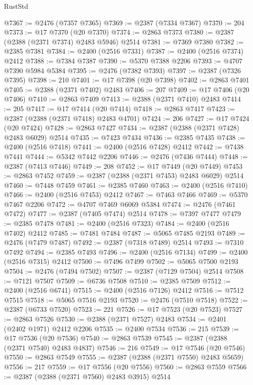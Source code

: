 \begin{lexlean}{RustStd}
\begin{coremodule}
@7367 := @2476 (@7357 @7365)
@7369 := @2387 (@7334 @7367)
@7370 := 204
@7373 := @17 @7370 (@20 @7370)
@7374 := @2863 @7373
@7380 := @2387 (@2388 (@2371 @7374) @2483 @5946) @2514
@7381 := @7369 @7380
@7382 := @2385 @7381
@7384 := @2400 (@2516 @7331)
@7387 := @2400 (@2516 @7374) @2412
@7388 := @7384 @7387
@7390 := @5370 @7388 @2206
@7393 := @4707 @7390 @5984 @5384
@7395 := @2476 (@7382 @7393)
@7397 := @2387 (@7326 @7395)
@7398 := 210
@7401 := @17 @7398 (@20 @7398)
@7402 := @2863 @7401
@7405 := @2388 (@2371 @7402) @2483
@7406 := 207
@7409 := @17 @7406 (@20 @7406)
@7410 := @2863 @7409
@7413 := @2388 (@2371 @7410) @2483
@7414 := 205
@7417 := @17 @7414 (@20 @7414)
@7418 := @2863 @7417
@7423 := @2387 (@2388 (@2371 @7418) @2483 @4701)
@7424 := 206
@7427 := @17 @7424 (@20 @7424)
@7428 := @2863 @7427
@7434 := @2387 (@2388 (@2371 @7428) @2483 @6029) @2514
@7435 := @7423 @7434
@7436 := @2385 @7435
@7438 := @2400 (@2516 @7418)
@7441 := @2400 (@2516 @7428) @2412
@7442 := @7438 @7441
@7444 := @5342 @7442 @2206
@7446 := @2476 (@7436 @7444)
@7448 := @2387 (@7413 @7446)
@7449 := 208
@7452 := @17 @7449 (@20 @7449)
@7453 := @2863 @7452
@7459 := @2387 (@2388 (@2371 @7453) @2483 @6029) @2514
@7460 := @7448 @7459
@7461 := @2385 @7460
@7463 := @2400 (@2516 @7410)
@7466 := @2400 (@2516 @7453) @2412
@7467 := @7463 @7466
@7469 := @5370 @7467 @2206
@7472 := @4707 @7469 @6069 @5384
@7474 := @2476 (@7461 @7472)
@7477 := @2387 (@7405 @7474) @2514
@7478 := @7397 @7477
@7479 := @2385 @7478
@7481 := @2400 (@2516 @7323)
@7484 := @2400 (@2516 @7402) @2412
@7485 := @7481 @7484
@7487 := @5065 @7485 @2193
@7489 := @2476 (@7479 @7487)
@7492 := @2387 (@7318 @7489) @2514
@7493 := @7310 @7492
@7494 := @2385 @7493
@7496 := @2400 (@2516 @7134)
@7499 := @2400 (@2516 @7315) @2412
@7500 := @7496 @7499
@7502 := @5065 @7500 @2193
@7504 := @2476 (@7494 @7502)
@7507 := @2387 (@7129 @7504) @2514
@7508 := @7121 @7507
@7509 := @6736 @7508
@7510 := @2385 @7509
@7512 := @2400 (@2516 @6741)
@7515 := @2400 (@2516 @7126) @2412
@7516 := @7512 @7515
@7518 := @5065 @7516 @2193
@7520 := @2476 (@7510 @7518)
@7522 := @2387 (@6733 @7520)
@7523 := 221
@7526 := @17 @7523 (@20 @7523)
@7527 := @2863 @7526
@7530 := @2388 (@2371 @7527) @2483
@7534 := @2401 (@2402 @1971) @2412 @2206
@7535 := @2400 @7534
@7536 := 215
@7539 := @17 @7536 (@20 @7536)
@7540 := @2863 @7539
@7545 := @2387 (@2388 (@2371 @7540) @2483 @4837)
@7546 := 216
@7549 := @17 @7546 (@20 @7546)
@7550 := @2863 @7549
@7555 := @2387 (@2388 (@2371 @7550) @2483 @5659)
@7556 := 217
@7559 := @17 @7556 (@20 @7556)
@7560 := @2863 @7559
@7566 := @2387 (@2388 (@2371 @7560) @2483 @3915) @2514

\end{coremodule}
\end{lexlean}
